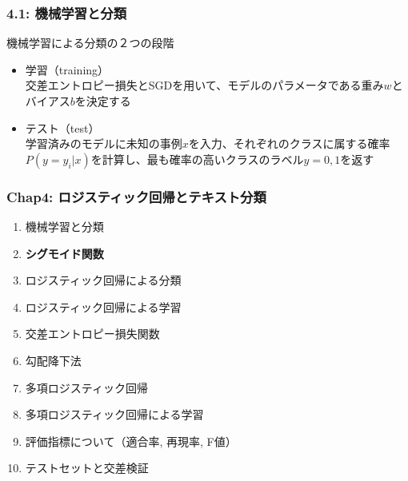 \documentclass[unicode,11pt]{beamer} %
\begin{document}
\begin{frame}
    \frametitle{4.1: 機械学習と分類}
    \begin{alertblock}{機械学習による分類の２つの段階}
        \begin{itemize}
            \item 学習（training）\\交差エントロピー損失とSGDを用いて、モデルのパラメータである重み$w$とバイアス$b$を決定する
            \item テスト（test）\\学習済みのモデルに未知の事例$x$を入力、それぞれのクラスに属する確率$P(y = y_i|x)$を計算し、最も確率の高いクラスのラベル$y=0,1$を返す
        \end{itemize}
    \end{alertblock}
\end{frame}


\begin{frame}
    \frametitle{Chap4: ロジスティック回帰とテキスト分類}
    \begin{block}{}
        \begin{enumerate}
            \item 機械学習と分類
            \item {\color{red}\textbf{シグモイド関数}}
            \item ロジスティック回帰による分類
            \item ロジスティック回帰による学習
            \item 交差エントロピー損失関数
            \item 勾配降下法
            \item 多項ロジスティック回帰
            \item 多項ロジスティック回帰による学習
            \item 評価指標について（適合率, 再現率, F値）
            \item テストセットと交差検証
        \end{enumerate}
    \end{block}
\end{frame}
\end{document}

